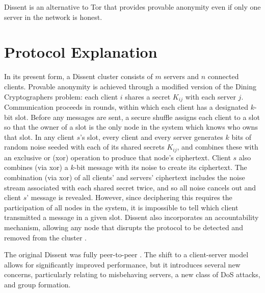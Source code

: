   Dissent is an alternative to Tor that provides provable anonymity even if
  only one server in the network is honest\cite{p2pd}.
  \section{Protocol Explanation}
  In its present form, a Dissent cluster consists of $m$ servers and $n$
  connected clients\cite{din}. Provable anonymity is
  achieved through a modified version of the Dining Cryptographers
  problem\cite{chaum_dining_1988}: each client $i$ shares a secret $K_{ij}$
  with each server $j$. Communication proceeds in rounds, within which each
  client has a designated $k$-bit slot.  Before any messages are sent, a
  secure shuffle\cite{neff} assigns each client to a slot so
  that the owner of a slot is the only node in the system which knows who owns
  that slot.  In any client $s$'s slot, every client and every server
  generates $k$ bits of random noise seeded with each of its shared secrets
  $K_{ij}$, and combines these with an exclusive or (xor) operation to produce
  that node's ciphertext. Client $s$ also combines (via xor) a $k$-bit message
  with its noise to create its ciphertext. The combination (via xor) of all
  clients' and servers' ciphertext includes the noise stream associated with
  each shared secret twice, and so all noise cancels out and client $s$'
  message is revealed. However, since deciphering this requires the
  participation of all nodes in the system, it is impossible to tell which
  client transmitted a message in a given slot. Dissent also incorporates an
  accountability mechanism, allowing any node that disrupts the protocol to be
  detected and removed from the cluster
  \cite{verdict}.

  The original Dissent was fully peer-to-peer
  \cite{p2pd}. The shift to a client-server model
  allows for significantly improved performance, but it introduces several new
  concerns, particularly relating to misbehaving servers, a new class of DoS
  attacks, and group formation.

